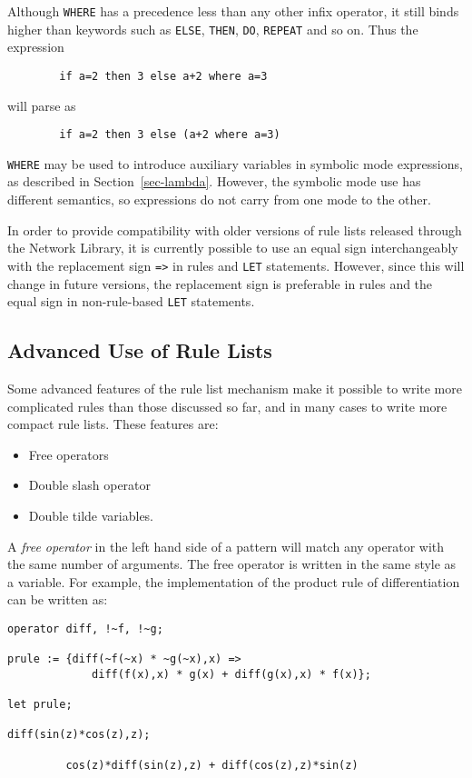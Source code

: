 Although \texttt{WHERE} has a precedence less than any other infix operator,
it still binds higher than keywords such as \texttt{ELSE}, \texttt{THEN},
\texttt{DO}, \texttt{REPEAT} and so on.  Thus the expression
\begin{verbatim}
        if a=2 then 3 else a+2 where a=3
\end{verbatim}
will parse as
\begin{verbatim}
        if a=2 then 3 else (a+2 where a=3)
\end{verbatim}

\texttt{WHERE} may be used to introduce auxiliary variables in symbolic mode
expressions, as described in Section~\ref{sec-lambda}.  However, the
symbolic mode use has different semantics, so expressions do not carry
from one mode to the other.

\COMPATNOTE In order to provide compatibility with older versions of rule
lists released through the Network Library, it is currently possible to use
an equal sign interchangeably with the replacement sign \texttt{=>} in rules
and \texttt{LET} statements.  However, since this will change in future
versions, the replacement sign is preferable in rules and the equal sign
in non-rule-based \texttt{LET} statements.

\subsection*{Advanced Use of Rule Lists}

Some advanced features of the rule list mechanism make it possible to
write more complicated rules than those discussed so far, and in many
cases to write more compact rule lists.  These features are:

\begin{itemize}
\item Free operators
\item Double slash operator
\item Double tilde variables.
\end{itemize}
A \emph{free operator} in the left hand side of a pattern will match any
operator with the same number of arguments.  The free operator is written
in the same style as a variable.  For example, the implementation of the
product rule of differentiation can be written as:
\begin{verbatim}
operator diff, !~f, !~g;

prule := {diff(~f(~x) * ~g(~x),x) =>
             diff(f(x),x) * g(x) + diff(g(x),x) * f(x)};

let prule;

diff(sin(z)*cos(z),z);

         cos(z)*diff(sin(z),z) + diff(cos(z),z)*sin(z)
\end{verbatim}

